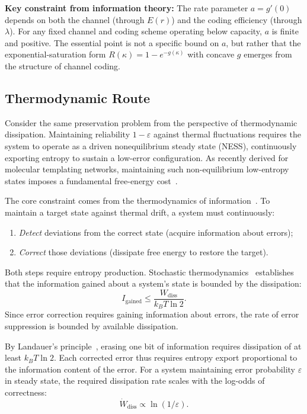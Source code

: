 \documentclass[11pt,twocolumn]{article}
\begin{document}
\textbf{Key constraint from information theory:} The rate parameter $a = g'(0)$ depends on both the channel (through $E(r)$) and the coding efficiency (through $\lambda$). For any fixed channel and coding scheme operating below capacity, $a$ is finite and positive. The essential point is not a specific bound on $a$, but rather that the exponential-saturation form $R(\kappa) = 1 - e^{-g(\kappa)}$ with concave $g$ emerges from the structure of channel coding.

\subsection{Thermodynamic Route}
\label{sec:landauer_route}

Consider the same preservation problem from the perspective of thermodynamic dissipation. Maintaining reliability $1 - \varepsilon$ against thermal fluctuations requires the system to operate as a driven nonequilibrium steady state (NESS), continuously exporting entropy to sustain a low-error configuration. As recently derived for molecular templating networks, maintaining such non-equilibrium low-entropy states imposes a fundamental free-energy cost~\cite{Ouldridge2025}.

The core constraint comes from the thermodynamics of information~\cite{Parrondo2015}. To maintain a target state against thermal drift, a system must continuously:
\begin{enumerate}[leftmargin=*,itemsep=2pt]
    \item \emph{Detect} deviations from the correct state (acquire information about errors);
    \item \emph{Correct} those deviations (dissipate free energy to restore the target).
\end{enumerate}
Both steps require entropy production. Stochastic thermodynamics~\cite{Seifert2012} establishes that the information gained about a system's state is bounded by the dissipation:
\begin{equation}
I_{\mathrm{gained}} \leq \frac{W_{\mathrm{diss}}}{k_B T \ln 2}.
\label{eq:info_diss_bound}
\end{equation}
Since error correction requires gaining information about errors, the rate of error suppression is bounded by available dissipation.

By Landauer's principle~\cite{Landauer1961}, erasing one bit of information requires dissipation of at least $k_B T \ln 2$. Each corrected error thus requires entropy export proportional to the information content of the error. For a system maintaining error probability $\varepsilon$ in steady state, the required dissipation rate scales with the log-odds of correctness:
\begin{equation}
\dot{W}_{\mathrm{diss}} \propto \ln(1/\varepsilon).
\label{eq:diss_rate}
\end{equation}
\end{document}
